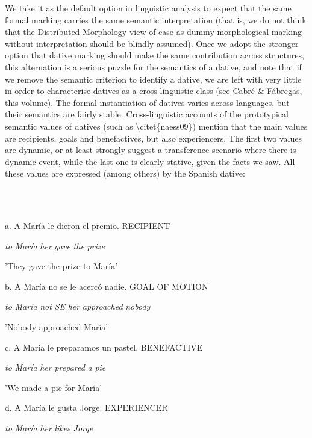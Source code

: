 \documentclass[output=paper,modfonts,nonflat]{langsci/langscibook}
\begin{document}
We take it as the default option in linguistic analysis to expect that the same formal marking carries the same semantic interpretation (that is, we do not think that the Distributed Morphology view of case as dummy morphological marking without interpretation should be blindly assumed). Once we adopt the stronger option that dative marking should make the same contribution across structures, this alternation is a serious puzzle for the semantics of a dative, and note that if we remove the semantic criterion to identify a dative, we are left with very little in order to characterise datives as a cross-linguistic class (see Cabré \& Fábregas, this volume). The formal instantiation of datives varies across languages, but their semantics are fairly stable. Cross-linguistic accounts of the prototypical semantic values of datives (such as {\textbackslash}citet\{naess09\}) mention that the main values are recipients, goals and benefactives, but also experiencers. The first two values are dynamic, or at least strongly suggest a transference scenario where there is dynamic event, while the last one is clearly stative, given the facts we saw. All these values are expressed (among others) by the Spanish dative:

\ea%
    \label{ex:key:10}
    \gll\\
        \\
    \glt
    \z

          a.   A María le     dieron el  premio.          RECIPIENT

         \textit{to} \textit{María} \textit{her} \textit{gave}  \textit{the} \textit{prize}

    {}'They gave the prize to María' 

    b.   A María  no  se  le   acercó     nadie.    GOAL OF MOTION

          \textit{to} \textit{María} \textit{not} \textit{SE} \textit{her} \textit{approached} \textit{nobody}

    {}'Nobody approached María'

    c.   A María le     preparamos un pastel.      BENEFACTIVE

          \textit{to} \textit{María} \textit{her}   \textit{prepared}     \textit{a}   \textit{pie}

    {}'We made a pie for María'

    d.   A María le     gusta Jorge.            EXPERIENCER

          \textit{to} \textit{María} \textit{her}   \textit{likes} \textit{Jorge}
\end{document}
